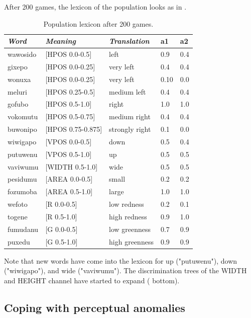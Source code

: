 After 200 games, the lexicon of the population looks as in . 
\begin{table}
\begin{center}
\begin{tabular}{ l  l  l  l  l } \midrule
{\it Word}&{\it Meaning}&{\it Translation} & {\bf a1}&{\bf a2} \\ \midrule
wawosido & [HPOS 0.0-0.5] &left&0.9&0.4\\ \midrule
gixepo & [HPOS 0.0-0.25] & very left&0.4&0.4\\ \midrule
wonuxa & [HPOS 0.0-0.25] & very left&0.10&0.0\\ \midrule
meluri & [HPOS 0.25-0.5] &medium left&0.4&0.4\\ \midrule
gofubo & [HPOS 0.5-1.0]& right&1.0&1.0\\ \midrule
vokomutu & [HPOS 0.5-0.75] &medium right&0.4&0.4\\ \midrule
buwonipo & [HPOS 0.75-0.875] &strongly right&0.1&0.0\\ \midrule
wiwigapo & [VPOS 0.0-0.5] &down&0.5&0.4\\ \midrule
putuwenu & [VPOS 0.5-1.0]&up & 0.5&0.5\\ \midrule
vaviwumu & [WIDTH 0.5-1.0]&wide & 0.5&0.5\\ \midrule
pesidumu & [AREA 0.0-0.5]&small& 0.2&0.2\\ \midrule
fozumoba & [AREA 0.5-1.0]&large & 1.0&1.0\\ \midrule
wefoto & [R 0.0-0.5]& low redness &0.2&0.1\\ \midrule
togene & [R 0.5-1.0]& high redness &0.9&1.0\\ \midrule
fumudanu & [G 0.0-0.5]& low greenness &0.7&0.9\\ \midrule
puxedu & [G 0.5-1.0]& high greenness &0.9&0.9\\ \midrule
\end{tabular}
\caption{ \label{tab:upper} Population lexicon after 200 games.}
\end{center}
\end{table}
Note that new words have come into the lexicon 
for up ("putuwenu"), down ("wiwigapo"), and 
wide ("vaviwumu"). The discrimination trees of 
the WIDTH and HEIGHT channel have started to 
expand ( bottom). 

\subsection{Coping with perceptual anomalies}

